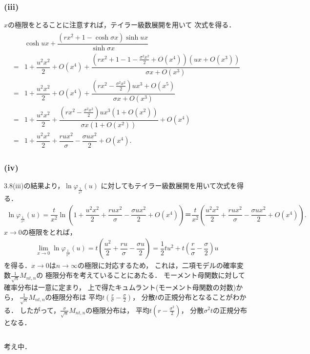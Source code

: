 \documentclass[a4paper,11pt]{jsarticle}
\newcommand{\df}[2]{\dfrac{#1}{#2}}
\newcommand{\1}{\mbox{1}\hspace{-0.30em}\mbox{1}}
\begin{document}
\subsubsection{(iii)}
$x$の極限をとることに注意すれば，テイラー級数展開を用いて
次式を得る．
\begin{align*}
  \begin{split}
    &\cosh{ux}+\df{(rx^2+1-\cosh{\sigma x})\sinh{ux}}
    {\sinh{\sigma x}} \\
    =&1+\df{u^2 x^2}{2}+O(x^4)+
    \df{ \left( rx^2+1 -1-\frac{\sigma^2 x^2}{2} +O(x^4)
    \right) (ux+O(x^3)) } {\sigma x+O(x^3)} \\
    =&1+\df{u^2 x^2}{2}+O(x^4)+
    \df{\left( rx^2-\frac{\sigma^2 x^2}{2}\right)ux^3+O(x^5)}
    {\sigma x+O(x^3)} \\
    =&1+\df{u^2 x^2}{2}+
    \df{\left( rx^2-\frac{\sigma^2 x^2}{2}\right)
    ux^3(1+O(x^2))}  {\sigma x(1+O(x^2))}  +O(x^4) \\
    =&1+\df{u^2 x^2}{2}+\df{rux^2}{\sigma}
    -\df{\sigma ux^2}{2}+O(x^4).
  \end{split}
\end{align*}

\subsubsection{(iv)}
3.8(iii)の結果より，$\ln\varphi_{\frac{1}{x^2}}(u)$
に対してもテイラー級数展開を用いて次式を得る．
\begin{align*}
  \ln\varphi_{\frac{1}{x^2}}(u)
  =\df{t}{x^2} \ln\left(
  1+\df{u^2 x^2}{2}+\df{rux^2}{\sigma}
  -\df{\sigma ux^2}{2}+O(x^4) \right)
  ＝\df{t}{x^2}\left(\df{u^2 x^2}{2}+\df{rux^2}{\sigma}
  -\df{\sigma ux^2}{2}+O(x^4) \right).
\end{align*}
$x\to0$の極限をとれば，
\begin{align*}
  \lim_{x\to0}\ln\varphi_{\frac{1}{x^2}}(u)
  =t(\df{u^2}{2}+\df{ru}{\sigma}-\df{\sigma u}{2})
  =\df{1}{2}tu^2+t(\df{r}{\sigma}-\df{\sigma}{2})u
\end{align*}
を得る．$x\to0$は$n\to\infty$の極限に対応するため，
これは，二項モデルの確率変数$\frac{1}{\sqrt{n}}M_{nt,n}$の
極限分布を考えていることにあたる．
モーメント母関数に対して確率分布は一意に定まり，
上で得たキュムラント(モーメント母関数の対数)から，
$\frac{1}{\sqrt{n}}M_{nt,n}$の極限分布は
平均$t(\frac{r}{\sigma}-\frac{\sigma}{2})$，
分散$t$の正規分布となることがわかる．
したがって，$\frac{\sigma}{\sqrt{n}}M_{nt,n}$の極限分布は，
平均$t(r-\frac{\sigma^2}{2})$，
分散$\sigma^2 t$の正規分布となる．

\subsection{} %
考え中．
\end{document}
